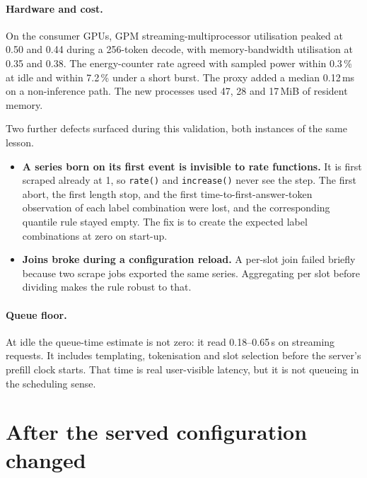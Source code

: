 \documentclass[11pt]{article}
\begin{document}
\paragraph{Hardware and cost.} On the consumer GPUs, GPM streaming-multiprocessor utilisation peaked
at 0.50 and 0.44 during a 256-token decode, with memory-bandwidth utilisation at 0.35 and 0.38. The
energy-counter rate agreed with sampled power within 0.3\,\% at idle and within 7.2\,\% under a
short burst. The proxy added a median 0.12\,ms on a non-inference path. The new processes used 47,
28 and 17\,MiB of resident memory.

Two further defects surfaced during this validation, both instances of the same lesson.
\begin{itemize}
\item \textbf{A series born on its first event is invisible to rate functions.} It is first scraped
already at 1, so \texttt{rate()} and \texttt{increase()} never see the step. The first abort, the
first length stop, and the first time-to-first-answer-token observation of each label combination
were lost, and the corresponding quantile rule stayed empty. The fix is to create the expected label
combinations at zero on start-up.
\item \textbf{Joins broke during a configuration reload.} A per-slot join failed briefly because two
scrape jobs exported the same series. Aggregating per slot before dividing makes the rule robust to
that.
\end{itemize}

\paragraph{Queue floor.} At idle the queue-time estimate is not zero: it read 0.18--0.65\,s on
streaming requests. It includes templating, tokenisation and slot selection before the server's
prefill clock starts. That time is real user-visible latency, but it is not queueing in the
scheduling sense.

\section{After the served configuration changed}\label{sec:update}
\end{document}
